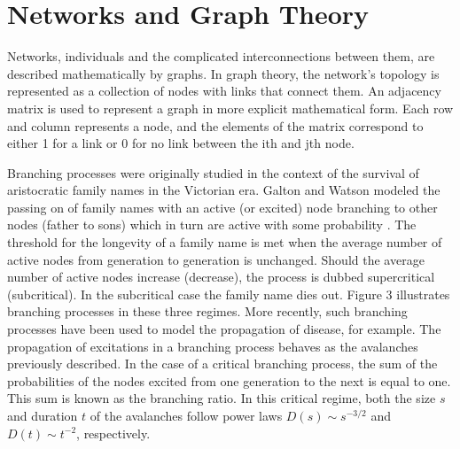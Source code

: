 \documentclass[12pt]{article}
\begin{document}
\section*{Networks and Graph Theory}

Networks, individuals and the complicated interconnections between them, are described mathematically by graphs. In graph theory, the network's topology is represented as a collection of nodes with links that connect them. An adjacency matrix is used to represent a graph in more explicit mathematical form. Each row and column represents a node, and the elements of the matrix correspond to either 1 for a link or 0 for no link between the ith and jth node.

Branching processes were originally studied in the context of the survival of aristocratic family names in the Victorian era. Galton and Watson modeled the passing on of family names with an active (or excited) node branching to other nodes (father to sons) which in turn are active with some probability \cite{Watson2014}. The threshold for the longevity of a family name is met when the average number of active nodes from generation to generation is unchanged. Should the average number of active nodes increase (decrease), the process is dubbed supercritical (subcritical). In the subcritical case the family name dies out. Figure 3 illustrates branching processes in these three regimes. More recently, such branching processes have been used to model the propagation of disease, for example. The propagation of excitations in a branching process behaves as the avalanches previously described. In the case of a critical branching process, the sum of the probabilities of the nodes excited from one generation to the next is equal to one. This sum is known as the branching ratio. In this critical regime, both the size $s$ and duration $t$ of the avalanches follow power laws $ D(s) \sim s^{-3/2} $ and $ D(t) \sim t^{-2} $, respectively. \cite{Larremore2014}
\end{document}
